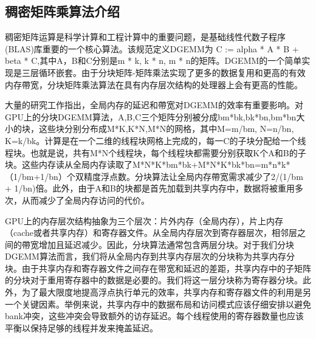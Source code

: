 \begin{flushleft}
\subsection{稠密矩阵乘算法介绍}
稠密矩阵运算是科学计算和工程计算中的重要问题，是基础线性代数子程序(BLAS)库重要的一个核心算法。该规范定义DGEMM为 C := alpha * A * B + beta * C,其中A，B和C分别是m * k, k * n, m * n的矩阵。DGEMM的一个简单实现是三层循环嵌套。由于分块矩阵-矩阵乘法实现了更多的数据复用和更高的有效内存帶宽，分块矩阵乘法算法在具有内存层次结构的处理器上会有更高的性能。

大量的研究工作指出，全局内存的延迟和帶宽对DGEMM的效率有重要影响。对GPU上的分块DGEMM算法，A,B,C三个矩阵分别被分成bm*bk,bk*bn,bm*bn大小的块，这些块分别分布成M*K,K*N,M*N的网格，其中M=m/bm, N=n/bn, K=k/bk。计算是在一个二维的线程块网格上完成的，每一C的子块分配给一个线程块。也就是说，共有M*N个线程块，每个线程块都需要分别获取K个A和B的子块。这些内存读从全局内存读取了M*N*K*bm*bk+M*N*K*bk*bn=m*n*k*（1/bm+1/bn）个双精度浮点数。分块算法让全局内存帶宽需求减少了2/(1/bm + 1/bn)倍。此外，由于A和B的块都是首先加载到共享内存中，数据将被重用多次，从而减少了全局内存访问的代价。

GPU上的内存层次结构抽象为三个层次：片外内存（全局内存），片上内存（cache或者共享内存）和寄存器文件。从全局内存层次到寄存器层次，相邻层之间的帶宽增加且延迟减少。因此，分块算法通常包含两层分块。对于我们分块DGEMM算法而言，我们将从全局内存到共享内存层次的分块称为共享内存分块。由于共享内存和寄存器文件之间存在带宽和延迟的差距，共享内存中的子矩阵的分块对于重用寄存器中的数据是必要的。我们将这一层分块称为寄存器分块。此外，为了最大限度地提高浮点执行单元的效率，共享内存和寄存器文件的利用是另一个关键因素。举例来说，共享内存中的数据布局和访问模式应该仔细安排以避免bank冲突，这些冲突会导致额外的访存延迟。每个线程使用的寄存器数量也应该平衡以保持足够的线程并发来掩盖延迟。


\end{flushleft}
